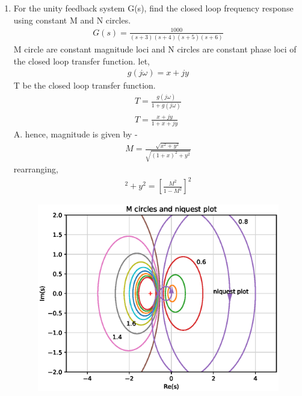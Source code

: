 \begin{enumerate}[label=\thesubsection.\arabic*.,ref=\thesubsection.\theenumi]
\item For the unity feedback system G(s), find the closed loop frequency response using constant M and N circles.
\begin{align}
    \label{eq:ee18btech11027_1}
    G(s) = \frac{1000}{(s+3)(s+4)(s+5)(s+6)}
\end{align}
\solution M circle are constant magnitude loci and N circles are constant phase loci of the closed loop transfer function.
let,
\begin{align}
 g(j\omega)=x+jy   
\end{align}
T be the closed loop transfer function.
\begin{align}
    T = \frac{g(j\omega)}{1+g(j\omega)}\\
    T = \frac{x+jy}{1+x+jy}
\end{align}
A. hence, magnitude is given by -
\begin{align}
     M  = \frac{\sqrt{x^2+y^2}}{\sqrt{(1+x)^2+y^2}}
\end{align}
rearranging,
\begin{align}
    [x-\frac{M^2 }{1- M^2}]^2 + y^2 = [\frac{M^2}{1-M^2}]^2
\end{align}

\begin{figure}[!ht]
\includegraphics[width=\columnwidth]{./figs/ee18btech11027/M_circles.eps} 
\caption{}
\label{fig:ee18btech11027}
\end{figure}


\end{enumerate}
